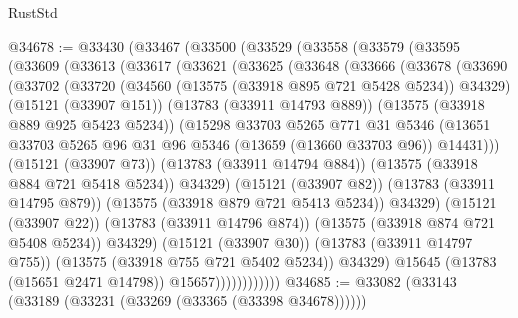 \begin{lexlean}{RustStd}
\begin{coremodule}
@34678 := @33430
    (@33467
      (@33500
        (@33529
          (@33558
            (@33579
              (@33595
                (@33609
                  (@33613
                    (@33617
                      (@33621
                        (@33625
                          (@33648
                            (@33666
                              (@33678
                                (@33690
                                  (@33702
                                    (@33720
                                      (@34560 (@13575 (@33918 @895 @721 @5428 @5234)) @34329)
                                      (@15121 (@33907 @151))
                                      (@13783 (@33911 @14793 @889))
                                      (@13575 (@33918 @889 @925 @5423 @5234))
                                      (@15298
                                        @33703
                                        @5265
                                        @771
                                        @31
                                        @5346
                                        (@13651
                                          @33703
                                          @5265
                                          @96
                                          @31
                                          @96
                                          @5346
                                          (@13659 (@13660 @33703 @96))
                                          @14431)))
                                    (@15121 (@33907 @73))
                                    (@13783 (@33911 @14794 @884))
                                    (@13575 (@33918 @884 @721 @5418 @5234))
                                    @34329)
                                  (@15121 (@33907 @82))
                                  (@13783 (@33911 @14795 @879))
                                  (@13575 (@33918 @879 @721 @5413 @5234))
                                  @34329)
                                (@15121 (@33907 @22))
                                (@13783 (@33911 @14796 @874))
                                (@13575 (@33918 @874 @721 @5408 @5234))
                                @34329)
                              (@15121 (@33907 @30))
                              (@13783 (@33911 @14797 @755))
                              (@13575 (@33918 @755 @721 @5402 @5234))
                              @34329)
                            @15645
                            (@13783 (@15651 @2471 @14798))
                            @15657))))))))))))
@34685 := @33082 (@33143 (@33189 (@33231 (@33269 (@33365 (@33398 @34678))))))

\end{coremodule}
\end{lexlean}
